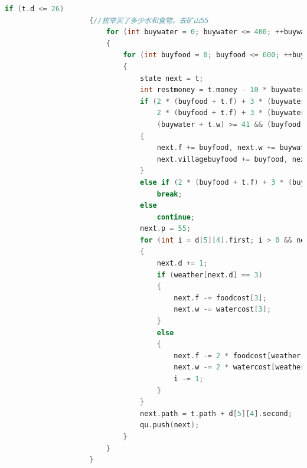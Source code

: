 \documentclass[withoutpreface,bwprint]{cumcmthesis} %
\begin{document}
\begin{appendices}
\begin{lstlisting}[language=c++]
                    if (t.d <= 26)
                    {//枚举买了多少水和食物，去矿山55
                        for (int buywater = 0; buywater <= 400; ++buywater)
                        {
                            for (int buyfood = 0; buyfood <= 600; ++buyfood)
                            {
                                state next = t;
                                int restmoney = t.money - 10 * buywater - 20 * buyfood;
                                if (2 * (buyfood + t.f) + 3 * (buywater + t.w) >= 1199 &&
                                    2 * (buyfood + t.f) + 3 * (buywater + t.w) <= 1200 && restmoney >= 0 && 
                                    (buywater + t.w) >= 41 && (buyfood + t.f) >= 42)
                                {
                                    next.f += buyfood, next.w += buywater, next.money = restmoney;
                                    next.villagebuyfood += buyfood, next.villagebuywater += buywater;
                                }
                                else if (2 * (buyfood + t.f) + 3 * (buywater + t.w) > 1200)
                                    break;
                                else
                                    continue;
                                next.p = 55;
                                for (int i = d[5][4].first; i > 0 && next.d <= 30;)
                                {
                                    next.d += 1;
                                    if (weather[next.d] == 3)
                                    {
                                        next.f -= foodcost[3];
                                        next.w -= watercost[3];
                                    }
                                    else
                                    {
                                        next.f -= 2 * foodcost[weather[next.d]];
                                        next.w -= 2 * watercost[weather[next.d]];
                                        i -= 1;
                                    }
                                }
                                next.path = t.path + d[5][4].second;
                                qu.push(next);
                            }
                        }
                    }
    

\end{lstlisting}
\end{appendices}
\end{document}
